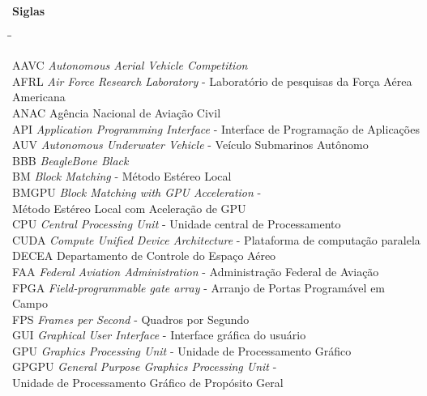 \textbf{\Huge{Siglas}}

\vspace{0.05\textheight}

\begin{tabbing}
\hspace*{0.5cm}\=\hspace{2.5cm}\= \kill

\> AAVC		\> \textit{Autonomous Aerial Vehicle Competition}									\\
\> AFRL		\> \textit{Air Force Research Laboratory} - Laboratório de pesquisas da Força Aérea Americana 				\\ 
\> ANAC		\> Agência Nacional de Aviação Civil 											\\
\> API		\> \textit{Application Programming Interface} - Interface de Programação de Aplicações					\\
\> AUV		\> \textit{Autonomous Underwater Vehicle} - Veículo Submarinos Autônomo	 						\\
\> BBB		\> \textit{BeagleBone Black}	 											\\
\> BM		\> \textit{Block Matching} - Método Estéreo Local	 								\\
\> BMGPU	\> \textit{Block Matching with GPU Acceleration} - 									\\
\>		\> Método Estéreo Local com Aceleração de GPU										\\
\> CPU		\> \textit{Central Processing Unit} - Unidade central de Processamento							\\
\> CUDA		\> \textit{Compute Unified Device Architecture} - Plataforma de computação paralela					\\
\> DECEA	\> Departamento de Controle do Espaço Aéreo										\\
\> FAA	 	\> \textit{Federal Aviation Administration} - Administração Federal de Aviação						\\
\> FPGA  	\> \textit{Field-programmable gate array} - Arranjo de Portas Programável em Campo					\\
\> FPS  	\> \textit{Frames per Second} - Quadros por Segundo									\\
\> GUI 	 	\> \textit{Graphical User Interface} - Interface gráfica do usuário							\\
\> GPU 	 	\> \textit{Graphics Processing Unit} - Unidade de Processamento Gráfico							\\
\> GPGPU 	\> \textit{General Purpose Graphics Processing Unit} -  								\\
\>		\> Unidade de Processamento Gráfico de Propósito Geral									\\

\end{tabbing}
